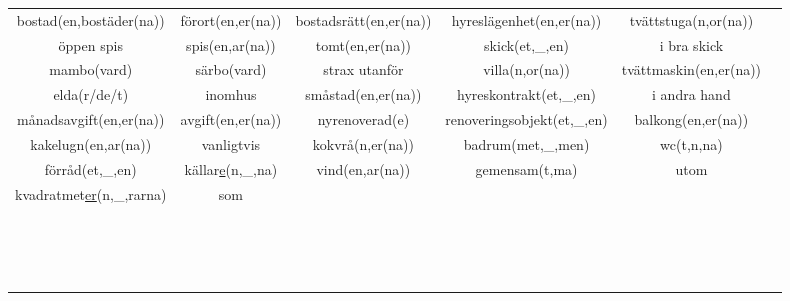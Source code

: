 
\begin{center}
    \begin{adjustwidth}{-2.5cm}{}
        \begin{tabular}{|c c c c c c|}
            \hline
            bostad(en,bostäder(na)) & förort(en,er(na)) & bostadsrätt(en,er(na)) & hyreslägenhet(en,er(na)) & tvättstuga(n,or(na)) &  \\
            öppen spis & spis(en,ar(na)) & tomt(en,er(na)) & skick(et,\_,en) & i bra skick &  \\
            mambo(vard) & särbo(vard) & strax utanför & villa(n,or(na)) & tvättmaskin(en,er(na)) &  \\
            elda(r/de/t) & inomhus & småstad(en,er(na)) & hyreskontrakt(et,\_,en) & i andra hand &  \\
            månadsavgift(en,er(na)) & avgift(en,er(na)) & nyrenoverad(e) & renoveringsobjekt(et,\_,en) & balkong(en,er(na)) &  \\
            kakelugn(en,ar(na)) & vanligtvis & kokvrå(n,er(na)) & badrum(met,\_,men) & wc(t,n,na) &  \\
            förråd(et,\_,en) & källar\underline{e}(n,\_,na) & vind(en,ar(na)) & gemensam(t,ma) & utom &  \\
            kvadratmet\underline{er}(n,\_,rarna) & som &  &  &  &  \\
             &  &  &  &  &  \\
             &  &  &  &  &  \\
             &  &  &  &  &  \\
             &  &  &  &  &  \\
             &  &  &  &  &  \\
             &  &  &  &  &  \\
             &  &  &  &  &  \\
             &  &  &  &  &  \\
             &  &  &  &  &  \\
             &  &  &  &  &  \\
             &  &  &  &  &  \\
             &  &  &  &  &  \\
             &  &  &  &  &  \\
             &  &  &  &  &  \\
             &  &  &  &  &  \\
             &  &  &  &  &  \\

\end{tabular}
\end{adjustwidth}
\end{center}
